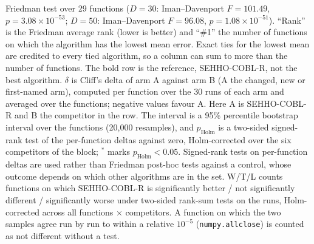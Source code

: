 \begin{table}[htbp]
\begin{flushleft}
Friedman test over 29 functions ($D=30$: Iman--Davenport $F=101.49$, $p=3.08\times10^{-53}$; $D=50$: Iman--Davenport $F=96.08$, $p=1.08\times10^{-51}$). ``Rank'' is the Friedman average rank (lower is better) and ``\#1'' the number of functions on which the algorithm has the lowest mean error. Exact ties for the lowest mean are credited to every tied algorithm, so a column can sum to more than the number of functions. The bold row is the reference, SEHHO-COBL-R, not the best algorithm. $\delta$ is Cliff's delta of arm A against arm B (A the changed, new or first-named arm), computed per function over the 30 runs of each arm and averaged over the functions; negative values favour A. Here A is SEHHO-COBL-R and B the competitor in the row. The interval is a 95\% percentile bootstrap interval over the functions (20{,}000 resamples), and $p_{\text{Holm}}$ is a two-sided signed-rank test of the per-function deltas against zero, Holm-corrected over the six competitors of the block; $^{*}$ marks $p_{\text{Holm}}<0.05$. Signed-rank tests on per-function deltas are used rather than Friedman post-hoc tests against a control, whose outcome depends on which other algorithms are in the set. W/T/L counts functions on which SEHHO-COBL-R is significantly better / not significantly different / significantly worse under two-sided rank-sum tests on the runs, Holm-corrected across all functions $\times$ competitors. A function on which the two samples agree run by run to within a relative $10^{-5}$ (\texttt{numpy.allclose}) is counted as not different without a test.
\end{flushleft}
\end{table}
